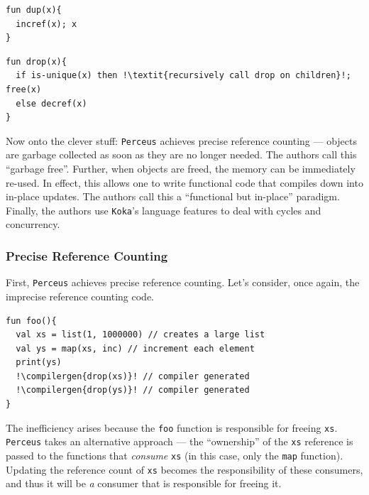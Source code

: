 \begin{code}
\label{code:reference-count-dup}
\begin{verbatim}
fun dup(x){
  incref(x); x
}
\end{verbatim}
\end{code}

\begin{code}
\label{code:reference-count-drop}
\begin{verbatim}
fun drop(x){
  if is-unique(x) then !\textit{recursively call drop on children}!; free(x)
  else decref(x)
}
\end{verbatim}
\end{code}

Now onto the clever stuff: \texttt{Perceus} achieves precise reference counting --- objects are garbage collected as soon as they are no longer needed. The authors call this ``garbage free''. Further, when objects are freed, the memory can be immediately re-used. In effect, this allows one to write functional code that compiles down into in-place updates. The authors call this a ``functional but in-place'' paradigm. Finally, the authors use \texttt{Koka}'s language features to deal with cycles and concurrency.

\subsubsection{Precise Reference Counting}
First, \texttt{Perceus} achieves precise reference counting. Let's consider, once again, the imprecise reference counting code. 

\begin{code}
\label{code:reference-count-base}
\begin{verbatim}
fun foo(){
  val xs = list(1, 1000000) // creates a large list
  val ys = map(xs, inc) // increment each element
  print(ys)
  !\compilergen{drop(xs)}! // compiler generated
  !\compilergen{drop(ys)}! // compiler generated
}
\end{verbatim}
\end{code}
The inefficiency arises because the \texttt{foo} function is responsible for freeing \texttt{xs}. \texttt{Perceus} takes an alternative approach --- the ``ownership'' of the \texttt{xs} reference is passed to the functions that \textit{consume} \texttt{xs} (in this case, only the \texttt{map} function). Updating the reference count of \texttt{xs} becomes the responsibility of these consumers, and thus it will be \textit{a} consumer that is responsible for freeing it. 

